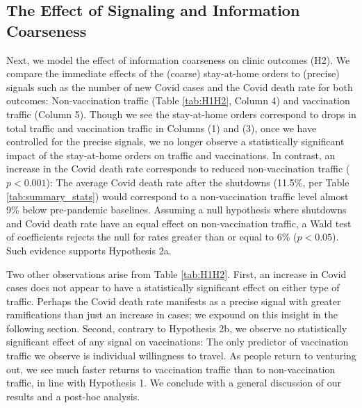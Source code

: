 \subsection{The Effect of Signaling and Information Coarseness}
 Next, we model the effect of information coarseness on clinic outcomes (H2). We compare the immediate effects of the (coarse) stay-at-home orders to (precise) signals such as the number of new Covid cases and the Covid death rate for both outcomes: Non-vaccination traffic (Table \ref{tab:H1H2}, Column 4) and vaccination traffic (Column 5). Though we see the stay-at-home orders correspond to drops in total traffic and vaccination traffic in Columns (1) and (3), once we have controlled for the precise signals, we no longer observe a statistically significant impact of the stay-at-home orders on traffic and vaccinations. In contrast, an increase in the Covid death rate corresponds to reduced non-vaccination traffic ($p < 0.001$): The average Covid death rate after the shutdowns (11.5\%, per Table \ref{tab:summary_stats}) would correspond to a non-vaccination traffic level almost 9\% below pre-pandemic baselines. Assuming a null hypothesis where shutdowns and Covid death rate have an equal effect on non-vaccination traffic, a Wald test of coefficients rejects the null for rates greater than or equal to 6\% ($p < 0.05$). Such evidence supports Hypothesis 2a.
 
 Two other observations arise from Table \ref{tab:H1H2}. First, an increase in Covid cases does not appear to have a statistically significant effect on either type of traffic. Perhaps the Covid death rate manifests as a precise signal with greater ramifications than just an increase in cases; we expound on this insight in the following section. Second, contrary to Hypothesis 2b, we observe no statistically significant effect of any signal on vaccinations: The only predictor of vaccination traffic we observe is individual willingness to travel. As people return to venturing out, we see much faster returns to vaccination traffic than to non-vaccination traffic, in line with Hypothesis 1. We conclude with a general discussion of our results and a post-hoc analysis.

